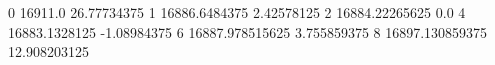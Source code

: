 0 16911.0 26.77734375
1 16886.6484375 2.42578125
2 16884.22265625 0.0
4 16883.1328125 -1.08984375
6 16887.978515625 3.755859375
8 16897.130859375 12.908203125
